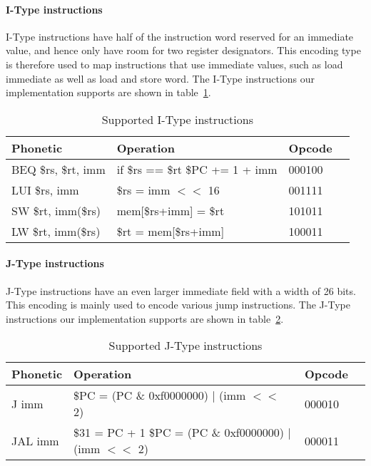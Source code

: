 \paragraph{I-Type instructions}
I-Type instructions have half of the instruction word reserved for an immediate value, and hence only have room for two register designators. This encoding type is therefore used to map instructions that use immediate values, such as load immediate as well as load and store word. The I-Type instructions our implementation supports are shown in table~\ref{table:itype_instructions}.



\begin{table}[h]
    \begin{tabular}{l|l|l|l}

    Phonetic & Operation & Opcode \\
    \hline
    BEQ \$rs, \$rt, imm  & if \$rs == \$rt \$PC += 1 + imm & 000100 \\
    LUI \$rs, imm        & \$rs = imm $<<$ 16                & 001111 \\
    SW \$rt, imm(\$rs)   & mem[\$rs+imm] = \$rt            & 101011 \\
    LW \$rt, imm(\$rs)   & \$rt = mem[\$rs+imm]            & 100011 \\
    \hline
    
    \end{tabular}

    \caption{Supported I-Type instructions}
    \label{table:itype_instructions}
\end{table}

\paragraph{J-Type instructions}
J-Type instructions have an even larger immediate field with a width of 26 bits. This encoding is mainly used to encode various jump instructions. The J-Type instructions our implementation supports are shown in table~\ref{table:jtype_instructions}.


\begin{table}[h]
    \begin{tabular}{l|l|l|l}

    Phonetic & Operation & Opcode \\
    \hline
    J imm  & \$PC = (PC \& 0xf0000000) | (imm $<<$ 2) & 000010 \\
    JAL imm  & \$31 = PC + 1 \$PC = (PC \& 0xf0000000) | (imm $<<$ 2) & 000011 \\
    \hline
    
    \end{tabular}

    \caption{Supported J-Type instructions}
    \label{table:jtype_instructions}
\end{table}
